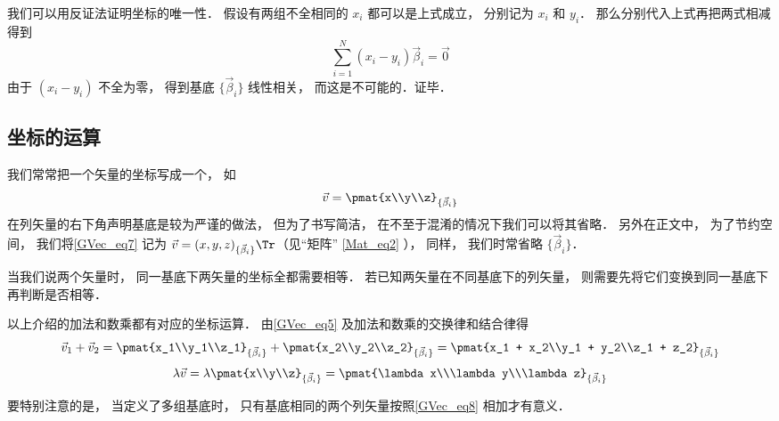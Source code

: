 我们可以用反证法证明坐标的唯一性． 假设有两组不全相同的 $x_i$ 都可以是上式成立， 分别记为 $x_i$ 和 $y_i$． 那么分别代入上式再把两式相减得到
\begin{equation}
\sum_{i=1}^N (x_i-y_i) \vec \beta_i = \vec 0
\end{equation}
由于 $(x_i-y_i)$ 不全为零， 得到基底 $\{\vec \beta_i\}$ 线性相关， 而这是不可能的．证毕．

\subsection{坐标的运算}
我们常常把一个矢量的坐标写成一个， 如
\begin{equation}\label{GVec_eq7}
\vec v = \pmat{x\\y\\z}_{\{\vec\beta_i\}}
\end{equation}
在列矢量的右下角声明基底是较为严谨的做法， 但为了书写简洁， 在不至于混淆的情况下我们可以将其省略． 另外在正文中， 为了节约空间， 我们将\autoref{GVec_eq7} 记为 $\vec v = (x, y, z)_{\{\vec\beta_i\}}\Tr$（见“矩阵” \autoref{Mat_eq2} ）， 同样， 我们时常省略 $\{\vec\beta_i\}$．

当我们说两个矢量时， 同一基底下两矢量的坐标全都需要相等． 若已知两矢量在不同基底下的列矢量， 则需要先将它们变换到同一基底下再判断是否相等．

以上介绍的加法和数乘都有对应的坐标运算． 由\autoref{GVec_eq5} 及加法和数乘的交换律和结合律得
\begin{equation}\label{GVec_eq8}
\vec v_1 + \vec v_2 = \pmat{x_1\\y_1\\z_1}_{\{\vec\beta_i\}} + \pmat{x_2\\y_2\\z_2}_{\{\vec\beta_i\}} = \pmat{x_1 + x_2\\y_1 + y_2\\z_1 + z_2}_{\{\vec\beta_i\}}
\end{equation}
\begin{equation}
\lambda \vec v = \lambda\pmat{x\\y\\z}_{\{\vec\beta_i\}} = \pmat{\lambda x\\\lambda y\\\lambda z}_{\{\vec\beta_i\}}
\end{equation}

要特别注意的是， 当定义了多组基底时， 只有基底相同的两个列矢量按照\autoref{GVec_eq8} 相加才有意义．





